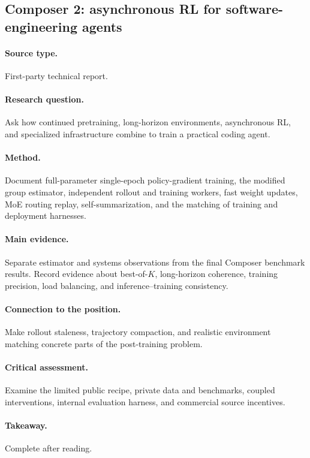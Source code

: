 \subsection{Composer 2: asynchronous RL for software-engineering agents
\citep{cursor2026composer2}}
\paragraph{Source type.} First-party technical report.
\paragraph{Research question.} Ask how continued pretraining, long-horizon environments,
asynchronous RL, and specialized infrastructure combine to train a practical coding agent.
\paragraph{Method.} Document full-parameter single-epoch policy-gradient training, the
modified group estimator, independent rollout and training workers, fast weight updates,
MoE routing replay, self-summarization, and the matching of training and deployment harnesses.
\paragraph{Main evidence.} Separate estimator and systems observations from the final
Composer benchmark results. Record evidence about best-of-$K$, long-horizon coherence,
training precision, load balancing, and inference--training consistency.
\paragraph{Connection to the position.} Make rollout staleness, trajectory compaction,
and realistic environment matching concrete parts of the post-training problem.
\paragraph{Critical assessment.} Examine the limited public recipe, private data and
benchmarks, coupled interventions, internal evaluation harness, and commercial source incentives.
\paragraph{Takeaway.} Complete after reading.
